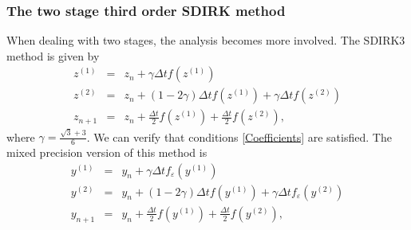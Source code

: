 \documentclass{siamart251104}
\newcommand{\dt}{\Delta t}
\begin{document}
\subsubsection{The two stage third order SDIRK method}
When dealing with two stages, 
the analysis becomes more involved.
The SDIRK3 method \cite{norsett} is given by 
\begin{subequations}
\begin{eqnarray}\label{SDIRK3} 
z^{(1)} & = & z_n + \gamma\dt f(z^{(1)})   \\ 
    z^{(2)} & = & z_n + (1-2\gamma)\dt  f(z^{(1)}) + \gamma\dt f(z^{(2)})\\
    z_{n+1} & = & z_n + \frac{\dt}{2}f(z^{(1)}) + \frac{\dt}{2}f(z^{(2)}),
\end{eqnarray}
\end{subequations}
where $\gamma = \frac{\sqrt{3} + 3}{6}$.
We can verify that conditions \eqref{Coefficients} are satisfied.
The mixed precision version of this method is
\begin{subequations} \label{MPSDIRK3} 
\begin{eqnarray}
y^{(1)} & = & y_n + \gamma\dt f_\varepsilon (y^{(1)})   \\ 
    y^{(2)} & = & y_n + (1-2\gamma)\dt  f(y^{(1)}) + \gamma\dt f_\varepsilon (y^{(2)})\\
    y_{n+1} & = & y_n + \frac{\dt}{2}f(y^{(1)}) + \frac{\dt}{2}f(y^{(2)}),
\end{eqnarray}
\end{subequations}
\end{document}
